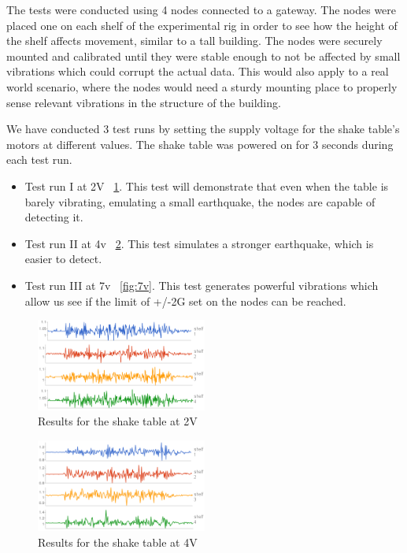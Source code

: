 The tests were conducted using 4 nodes connected to a gateway. The nodes were placed one on each shelf of the experimental rig in order to see how the height of the shelf affects movement, 
similar to a tall building. The nodes were securely mounted and calibrated until they were stable enough to not be affected by small vibrations which could corrupt the actual data. 
This would also apply to a real world scenario, where the nodes would need a sturdy mounting place to properly sense relevant vibrations in the structure of the building.

We have conducted 3 test runs by setting the supply voltage for the shake table's motors at different values. The shake table was powered on for 3 seconds during each test run.
\begin{itemize}

\item Test run I at 2V ~\ref{fig:2v}. This test will demonstrate that even when the table is barely vibrating, emulating a small earthquake, the nodes are capable of detecting it.
\item Test run II at 4v ~\ref{fig:4v}. This test simulates a stronger earthquake, which is easier to detect.
\item Test run III at 7v ~\ref{fig:7v}. This test generates powerful vibrations which allow us see if the limit of +/-2G set on the nodes can be reached.
\end{itemize}

\begin{figure}[ht] \centering
  \includegraphics[width=0.5\textwidth]{img/2v.png}
  \caption{Results for the shake table at 2V}
  \label{fig:2v}
\end{figure}

\begin{figure}[ht] \centering
  \includegraphics[width=0.5\textwidth]{img/4v.png}
  \caption{Results for the shake table at 4V}
  \label{fig:4v}
\end{figure}

